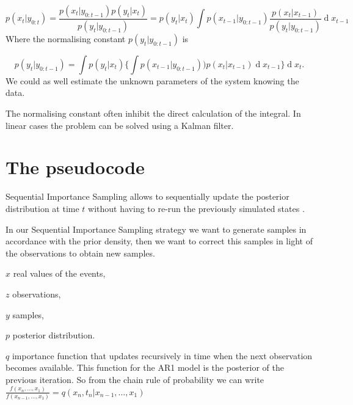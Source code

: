 \documentclass[11pt,a4paper]{article}
\renewcommand{\d}[1]{\ensuremath{\operatorname{d}\!{#1}}}
\begin{document}
\[
p(x_{t} | y_{0 : t}) = \frac{ p(x_{t} | y_{0 : t - 1}) p(y_{t} | x_{t})}{p(y_{t} | y_{0 : t - 1})} = p(y_{t} | x_{t}) \int p(x_{t - 1} | y_{0 : t - 1}) \frac{p(x_t | x_{t - 1})}{p(y_t | y_{0 : t - 1})} \d x_{t - 1}
\]
Where the normalising constant $p(y_{t} | y_{0 : t - 1})$ is

\[
p(y_{t} | y_{0 : t - 1}) = \int p(y_{t} | x_{t}) \Bigg \{ \int p(x_{t - 1} | y_{0 : t - 1})) p(x_t | x_{t - 1}) \d x_{t - 1}\Bigg\} \d x_t.
\]
We could as well estimate the unknown parameters of the system knowing the data.

The normalising constant often inhibit the direct calculation of the integral. In linear cases the problem can be solved using a Kalman filter.


\section{The pseudocode}

Sequential Importance Sampling allows to sequentially update the posterior distribution at time $t$ without having to re-run the previously simulated states \cite{Turner}.

In our Sequential Importance Sampling strategy we want to generate samples in accordance with the prior density, then we want to correct this samples in light of the observations to obtain new samples. 

$x$ real values of the events, 

$z$ observations, 

$y$ samples, 

$p$ posterior distribution.

$q$ importance function that updates recursively in time when the next observation becomes available. This function for the AR1 model is the posterior of the previous iteration. So from the chain rule of probability we can write $\frac{f(x_n, \dots, x_1)}{f(x_{n-1}, \dots, x_1)} = q(x_n, t_n | x_{n-1}, \dots, x_1)$


\end{document}
